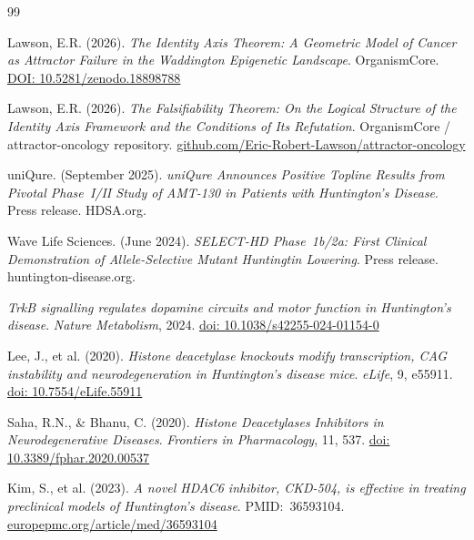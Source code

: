 \documentclass[12pt,a4paper]{article}
\begin{document}
\newpage
\begin{thebibliography}{99}

Lawson, E.R. (2026).
\textit{The Identity Axis Theorem: A Geometric Model of
Cancer as Attractor Failure in the Waddington Epigenetic
Landscape}.
OrganismCore.
\href{https://doi.org/10.5281/zenodo.18898788}%
{DOI: 10.5281/zenodo.18898788}

Lawson, E.R. (2026).
\textit{The Falsifiability Theorem: On the Logical
Structure of the Identity Axis Framework and the
Conditions of Its Refutation}.
OrganismCore / attractor-oncology repository.
\href{https://github.com/Eric-Robert-Lawson/attractor-oncology}%
{github.com/Eric-Robert-Lawson/attractor-oncology}

uniQure. (September 2025).
\textit{uniQure Announces Positive Topline Results from
Pivotal Phase~I/II Study of AMT-130 in Patients with
Huntington's Disease}. Press release. HDSA.org.

Wave Life Sciences. (June 2024).
\textit{SELECT-HD Phase~1b/2a: First Clinical Demonstration
of Allele-Selective Mutant Huntingtin Lowering}.
Press release. huntington-disease.org.

\textit{TrkB signalling regulates dopamine circuits and
motor function in Huntington's disease}.
\textit{Nature Metabolism}, 2024.
\href{https://doi.org/10.1038/s42255-024-01154-0}%
{doi: 10.1038/s42255-024-01154-0}

Lee, J., et al. (2020).
\textit{Histone deacetylase knockouts modify transcription,
CAG instability and neurodegeneration in Huntington's
disease mice}.
\textit{eLife}, 9, e55911.
\href{https://doi.org/10.7554/eLife.55911}%
{doi: 10.7554/eLife.55911}

Saha, R.N., \& Bhanu, C. (2020).
\textit{Histone Deacetylases Inhibitors in
Neurodegenerative Diseases}.
\textit{Frontiers in Pharmacology}, 11, 537.
\href{https://doi.org/10.3389/fphar.2020.00537}%
{doi: 10.3389/fphar.2020.00537}

Kim, S., et al. (2023).
\textit{A novel HDAC6 inhibitor, CKD-504, is effective in
treating preclinical models of Huntington's disease}.
PMID:~36593104.
\href{https://europepmc.org/article/med/36593104}%
{europepmc.org/article/med/36593104}


\end{thebibliography}
\end{document}
